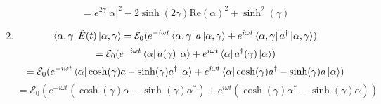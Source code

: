 \begin{sol}
\begin{enumerate}[label=\textbf{(\alph*)}]
\begin{equation}
	=e^{2\gamma}|\alpha|^2-2\sinh(2\gamma)\text{Re}(\alpha)^2+\sinh^2(\gamma)
\end{equation}
\item
\begin{equation}
	\bra{\alpha,\gamma}\hat E(t)\ket{\alpha,\gamma}=\mathcal{E}_0(e^{-i\omega t}\bra{\alpha,\gamma}a\ket{\alpha,\gamma}+e^{i\omega t}\bra{\alpha,\gamma}a^\dagger\ket{\alpha,\gamma})
\end{equation} 
\begin{equation}
	=\mathcal{E}_0(e^{-i\omega t}\bra{\alpha}a(\gamma)\ket\alpha+e^{i\omega t}\bra\alpha a^\dagger(\gamma)\ket\alpha)
\end{equation}
\begin{equation}
	=\mathcal{E}_0(e^{-i\omega t}\bra{\alpha}\cosh(\gamma)a-\sinh(\gamma)a^\dagger\ket\alpha+e^{i\omega t}\bra\alpha\cosh(\gamma)a^\dagger-\sinh(\gamma)a\ket\alpha)
\end{equation}
\begin{equation}
	=\mathcal E_0(e^{-i\omega t}(\cosh(\gamma)\alpha-\sinh(\gamma)\alpha^*)+e^{i\omega t}(\cosh(\gamma)\alpha^*-\sinh(\gamma)\alpha))
\end{equation} 
\end{enumerate}
\end{sol}